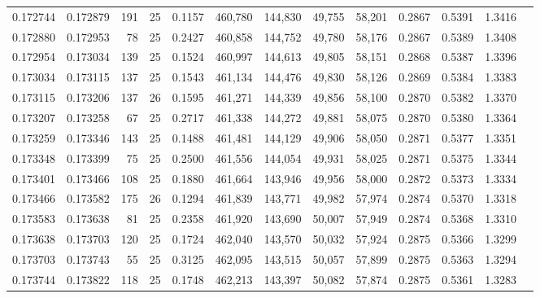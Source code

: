 \begin{tabular}{rrrrrrrrrrrrr}
0.172744 & 0.172879 &   191 &  25 &                                     0.1157 & 460,780 & 144,830 &  49,755 &  58,201 & 0.2867 & 0.5391 & 1.3416 \\
0.172880 & 0.172953 &    78 &  25 &                                     0.2427 & 460,858 & 144,752 &  49,780 &  58,176 & 0.2867 & 0.5389 & 1.3408 \\
0.172954 & 0.173034 &   139 &  25 &                                     0.1524 & 460,997 & 144,613 &  49,805 &  58,151 & 0.2868 & 0.5387 & 1.3396 \\
0.173034 & 0.173115 &   137 &  25 &                                     0.1543 & 461,134 & 144,476 &  49,830 &  58,126 & 0.2869 & 0.5384 & 1.3383 \\
0.173115 & 0.173206 &   137 &  26 &                                     0.1595 & 461,271 & 144,339 &  49,856 &  58,100 & 0.2870 & 0.5382 & 1.3370 \\
0.173207 & 0.173258 &    67 &  25 &                                     0.2717 & 461,338 & 144,272 &  49,881 &  58,075 & 0.2870 & 0.5380 & 1.3364 \\
0.173259 & 0.173346 &   143 &  25 &                                     0.1488 & 461,481 & 144,129 &  49,906 &  58,050 & 0.2871 & 0.5377 & 1.3351 \\
0.173348 & 0.173399 &    75 &  25 &                                     0.2500 & 461,556 & 144,054 &  49,931 &  58,025 & 0.2871 & 0.5375 & 1.3344 \\
0.173401 & 0.173466 &   108 &  25 &                                     0.1880 & 461,664 & 143,946 &  49,956 &  58,000 & 0.2872 & 0.5373 & 1.3334 \\
0.173466 & 0.173582 &   175 &  26 &                                     0.1294 & 461,839 & 143,771 &  49,982 &  57,974 & 0.2874 & 0.5370 & 1.3318 \\
0.173583 & 0.173638 &    81 &  25 &                                     0.2358 & 461,920 & 143,690 &  50,007 &  57,949 & 0.2874 & 0.5368 & 1.3310 \\
0.173638 & 0.173703 &   120 &  25 &                                     0.1724 & 462,040 & 143,570 &  50,032 &  57,924 & 0.2875 & 0.5366 & 1.3299 \\
0.173703 & 0.173743 &    55 &  25 &                                     0.3125 & 462,095 & 143,515 &  50,057 &  57,899 & 0.2875 & 0.5363 & 1.3294 \\
0.173744 & 0.173822 &   118 &  25 &                                     0.1748 & 462,213 & 143,397 &  50,082 &  57,874 & 0.2875 & 0.5361 & 1.3283 \\

\end{tabular}
